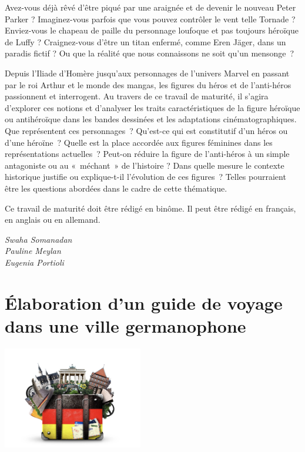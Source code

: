 \documentclass[
  10pt,
  french,
  a5paper,
  openany]{book}
\newenvironment{signature}{\begin{flushright}}{\end{flushright}}
\begin{document}
Avez-vous déjà rêvé d'être piqué par une araignée et de devenir le nouveau Peter Parker ? Imaginez-vous parfois que vous pouvez contrôler le vent telle Tornade ? Enviez-vous le chapeau de paille du personnage loufoque et pas toujours héroïque de Luffy ? Craignez-vous d'être un titan enfermé, comme Eren Jäger, dans un paradis fictif ? Ou que la réalité que nous connaissons ne soit qu'un mensonge~?

Depuis l'Iliade d'Homère jusqu'aux personnages de l'univers Marvel en passant par le roi Arthur et le monde des mangas, les figures du héros et de l'anti-héros passionnent et interrogent. Au travers de ce travail de maturité, il s'agira d'explorer ces notions et d'analyser les traits caractéristiques de la figure héroïque ou antihéroïque dans les bandes dessinées et les adaptations cinématographiques. Que représentent ces personnages~? Qu'est-ce qui est constitutif d'un héros ou d'une héroïne~? Quelle est la place accordée aux figures féminines dans les représentations actuelles~? Peut-on réduire la figure de l'anti-héros à un simple antagoniste ou au «~méchant~» de l'histoire ? Dans quelle mesure le contexte historique justifie ou explique-t-il l'évolution de ces figures~? Telles pourraient être les questions abordées dans le cadre de cette thématique.

Ce travail de maturité doit être rédigé en binôme. Il peut être rédigé en français, en anglais ou en allemand.

\begin{signature}
\emph{Swaha Somanadan}\\
\emph{Pauline Meylan}\\
\emph{Eugenia Portioli}

\end{signature}

\hypertarget{uxe9laboration-dun-guide-de-voyage-dans-une-ville-germanophone}{%
\chapter{Élaboration d'un guide de voyage dans une ville germanophone}\label{uxe9laboration-dun-guide-de-voyage-dans-une-ville-germanophone}}

\begin{center}
\includegraphics[width=\textwidth,height=12em]{images/elaboration-dun-guide-de-voyage.jpg}

\end{center}
\end{document}
